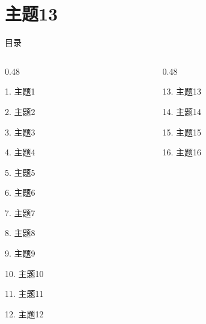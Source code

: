 \documentclass[aspectratio=169,10pt,fontset=fandol]{ctexbeamer}
\begin{document}
\section{主题13}
\begin{frame}[t,fragile]{目录}
\small
\begin{columns}[T,onlytextwidth]
\begin{column}{0.48\textwidth}
{\color{black}\small 1. 主题1\par}\vspace{0.22em}
{\color{black}\small 2. 主题2\par}\vspace{0.22em}
{\color{black}\small 3. 主题3\par}\vspace{0.22em}
{\color{black}\small 4. 主题4\par}\vspace{0.22em}
{\color{black}\small 5. 主题5\par}\vspace{0.22em}
{\color{black}\small 6. 主题6\par}\vspace{0.22em}
{\color{black}\small 7. 主题7\par}\vspace{0.22em}
{\color{black}\small 8. 主题8\par}\vspace{0.22em}
{\color{black}\small 9. 主题9\par}\vspace{0.22em}
{\color{black}\small 10. 主题10\par}\vspace{0.22em}
{\color{black}\small 11. 主题11\par}\vspace{0.22em}
{\color{black}\small 12. 主题12\par}\vspace{0.22em}
\end{column}
\begin{column}{0.48\textwidth}
{\color{blue}\small 13. 主题13\par}\vspace{0.22em}
{\color{gray!40}\small 14. 主题14\par}\vspace{0.22em}
{\color{gray!40}\small 15. 主题15\par}\vspace{0.22em}
{\color{gray!40}\small 16. 主题16\par}\vspace{0.22em}

\end{column}
\end{columns}
\end{frame}
\end{document}
